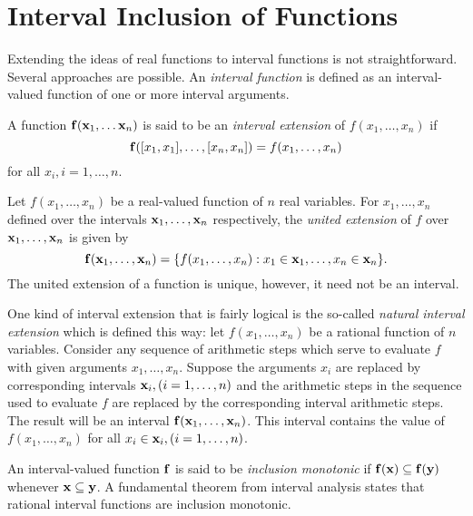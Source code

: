 \section{Interval Inclusion of Functions}
Extending the ideas of real functions to interval functions is not
straightforward.   Several approaches are possible.  
An {\it interval function} is defined as an
interval-valued function of one or more interval arguments.

A function ${\bf f}({\bf x}_1, \ldots {\bf x}_n)$ is said to be an
{\it interval extension} of $f(x_1, \ldots, x_n)$ if 
$${\bf f}([x_1,x_1], \ldots, [x_n,x_n]) = f(x_1, \ldots, x_n)$$
for all $x_i, i=1,\ldots,n$.

Let $f(x_1,\ldots,x_n)$ be a real-valued function of $n$ real variables.  For
$x_1,\ldots,x_n$ defined over the intervals
${\bf x}_1,\ldots,{\bf x}_n$ respectively, the
{\it united extension} of $f$ over ${\bf x}_1,\ldots,{\bf x}_n$ is given by
$$
{\bf f}({\bf x}_1,\ldots,{\bf x}_n) = 
 \{ f( x_1,\ldots, x_n) : x_1 \in {\bf x}_1,\ldots,x_n \in {\bf x}_n
 \}.
$$
The united extension of a function is unique, however, it need not be an
interval.

One kind of  interval extension that is fairly logical
is the so-called {\it natural interval extension} which
is defined this way:
let $f(x_1,\ldots,x_n)$ be a rational function of
$n$ variables.  Consider any sequence of arithmetic steps which serve to
evaluate $f$ with given arguments $x_1,\ldots,x_n$.  Suppose the
arguments $x_i$ are replaced by corresponding intervals 
${\bf x}_i, (i=1,\ldots,n)$ and
the arithmetic steps in the sequence used to evaluate $f$ are replaced by the
corresponding interval arithmetic steps.  The result will be an interval ${\bf
f}({\bf x}_1,\ldots,{\bf x}_n)$.  This interval contains the value of
$f(x_1,\ldots,x_n)$ for all $x_i \in {\bf x}_i, (i=1,\ldots,n)$.

An interval-valued function ${\bf f}$ is said to be 
{\it inclusion monotonic} if 
${\bf f(x) \subseteq f(y)}$ whenever ${\bf x \subseteq y}$.
A fundamental theorem from interval analysis states that rational interval
functions are inclusion monotonic.

